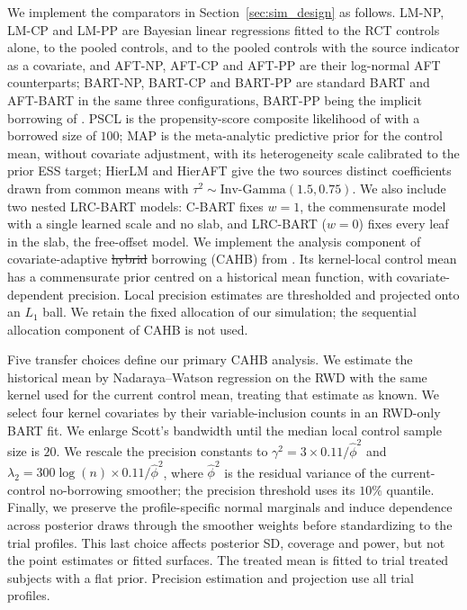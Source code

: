 \documentclass[11pt]{article}
\theoremstyle{definition}
\theoremstyle{plain}
\providecommand{\DIFaddtex}[1]{{\protect\color{blue}\uwave{#1}}} %
\providecommand{\DIFdeltex}[1]{{\protect\color{red}\sout{#1}}}                      %
\providecommand{\DIFaddbegin}{} %
\providecommand{\DIFaddend}{} %
\providecommand{\DIFdelbegin}{} %
\providecommand{\DIFdelend}{} %
\providecommand{\DIFadd}[1]{\texorpdfstring{\DIFaddtex{#1}}{#1}} %
\providecommand{\DIFdel}[1]{\texorpdfstring{\DIFdeltex{#1}}{}} %
\newcommand{\DIFscaledelfig}{0.5}
\newlength{\DIFdelgraphicswidth} %
\newlength{\DIFdelgraphicsheight} %
\newcommand{\DIFaddincludegraphics}[2][]{{\color{blue}\fbox{\DIFOincludegraphics[#1]{#2}}}} %
\newcommand{\DIFdelincludegraphics}[2][]{%
\sbox{\DIFdelgraphicsbox}{\DIFOincludegraphics[#1]{#2}}%
\settoboxwidth{\DIFdelgraphicswidth}{\DIFdelgraphicsbox} %
\settoboxtotalheight{\DIFdelgraphicsheight}{\DIFdelgraphicsbox} %
\scalebox{\DIFscaledelfig}{%
\parbox[b]{\DIFdelgraphicswidth}{\usebox{\DIFdelgraphicsbox}\\[-\baselineskip] \rule{\DIFdelgraphicswidth}{0em}}\llap{\resizebox{\DIFdelgraphicswidth}{\DIFdelgraphicsheight}{%
\setlength{\unitlength}{\DIFdelgraphicswidth}%
\begin{picture}(1,1)%
\thicklines\linethickness{2pt} %
{\color[rgb]{1,0,0}\put(0,0){\framebox(1,1){}}}%
{\color[rgb]{1,0,0}\put(0,0){\line( 1,1){1}}}%
{\color[rgb]{1,0,0}\put(0,1){\line(1,-1){1}}}%
\end{picture}%
}\hspace*{3pt}}} %
} %
\DeclareRobustCommand{\DIFaddbegin}{\DIFOaddbegin \let\includegraphics\DIFaddincludegraphics} %
\DeclareRobustCommand{\DIFaddend}{\DIFOaddend \let\includegraphics\DIFOincludegraphics} %
\DeclareRobustCommand{\DIFdelbegin}{\DIFOdelbegin \let\includegraphics\DIFdelincludegraphics} %
\DeclareRobustCommand{\DIFdelend}{\DIFOaddend \let\includegraphics\DIFOincludegraphics} %
\begin{document}
We implement the comparators in Section~\ref{sec:sim_design} as follows. LM-NP, LM-CP and LM-PP are Bayesian linear regressions fitted to the RCT controls alone, to the pooled controls, and to the pooled controls with the source indicator as a covariate, and AFT-NP, AFT-CP and AFT-PP are their log-normal AFT counterparts; BART-NP, BART-CP and BART-PP are standard BART and AFT-BART \citep{Chipman2010BART,Sparapani2021BART} in the same three configurations, BART-PP being the implicit borrowing of \citet{ZhouJi2021}. PSCL is the propensity-score composite likelihood of \citet{Chen2020PSCL} with a borrowed size of $100$; MAP is the meta-analytic predictive prior for the control mean, without covariate adjustment, with its heterogeneity scale calibrated to the prior ESS target; HierLM and HierAFT give the two sources distinct coefficients drawn from common means with $\tau^2\sim\text{Inv-Gamma}(1.5,0.75)$. We also include two nested LRC-BART models: C-BART fixes $w=1$, the commensurate model with a single learned scale and no slab, and LRC-BART ($w=0$) fixes every leaf in the slab, the free-offset model.
We implement the analysis component of covariate-adaptive \DIFdelbegin \DIFdel{hybrid }\DIFdelend \DIFaddbegin \DIFadd{historical control }\DIFaddend borrowing (CAHB) from \citet{Jin2023CAHB}. Its kernel-local control mean has a commensurate prior centred on a historical mean function, with covariate-dependent precision. Local precision estimates are thresholded and projected onto an $L_1$ ball. We retain the fixed allocation of our simulation; the sequential allocation component of CAHB is not used.

Five transfer choices define our primary CAHB analysis. We estimate the historical mean by Nadaraya--Watson regression on the RWD with the same kernel used for the current control mean, treating that estimate as known. We select four kernel covariates by their variable-inclusion counts in an RWD-only BART fit. We enlarge Scott's bandwidth until the median local control sample size is $20$. We rescale the precision constants to $\gamma^2=3\times0.11/\hat\phi^2$ and $\lambda_2=300\log(n)\times0.11/\hat\phi^2$, where $\hat\phi^2$ is the residual variance of the current-control no-borrowing smoother; the precision threshold uses its $10\%$ quantile. Finally, we preserve the profile-specific normal marginals and induce dependence across posterior draws through the smoother weights before standardizing to the trial profiles. This last choice affects posterior SD, coverage and power, but not the point estimates or fitted surfaces. The treated mean is fitted to trial treated subjects with a flat prior. Precision estimation and projection use all trial profiles.
\end{document}
